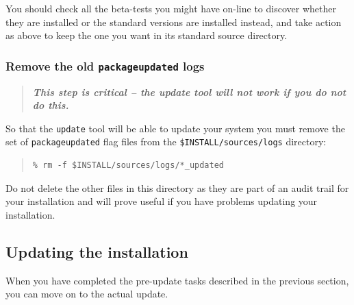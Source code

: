 \documentclass[twoside,11pt]{article}
\newcommand{\xlabel}[1]{}
\renewcommand{\_}{\texttt{\symbol{95}}}
\begin{document}
You should check all the beta-tests you might have on-line to discover
whether they are installed or the standard versions are installed instead,
and take action as above to keep the one you want in its standard
source directory.

\subsubsection{Remove the old \texttt{package\_updated} logs}

\begin{quote}
\textbf{\textit{This step is critical -- the update tool will not work if you
do not do this.}}
\end{quote}

So that the \texttt{update} tool will be able to update your system you
must remove the set of \texttt{package\_updated} flag files from the
\texttt{\$INSTALL/sources/logs} directory:

\begin{quote}
\begin{verbatim}
% rm -f $INSTALL/sources/logs/*_updated
\end{verbatim}
\end{quote}

Do not delete the other files in this directory as they are part of an
audit trail for your installation and will prove useful if you have
problems updating your installation.

%
%
%

\subsection{\xlabel{updating_the_installation}Updating the installation}
\label{updating_the_installation}

When you have completed the pre-update tasks described in the previous
section, you can move on to the actual update.
\end{document}
